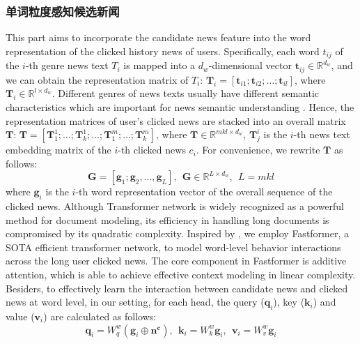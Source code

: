 \documentclass[withoutpreface,bwprint]{cumcmthesis} %
\begin{document}
	\subsubsection{ 单词粒度感知候选新闻}
	This part aims to incorporate the candidate news feature into the word representation of the clicked history news of users. 
	Specifically, each word $t_{ij}$ of the $i$-th genre news text $T_i$ is mapped into a $d_w$-dimensional vector $\mathbf{t}_{ij} \in \mathbb{R}^{d_w}$, and we can obtain the representation matrix of $T_i$: $\mathbf{T}_i = [\mathbf{t}_{i1}; \mathbf{t}_{i2}; \dots; \mathbf{t}_{il}]$, where  $\mathbf{T}_i \in \mathbb{R}^{l \times d_w}$. 
	Diﬀerent genres of news texts usually have diﬀerent semantic characteristics which are important for news semantic understanding .  Hence, the representation matrices of user's clicked news are stacked into an overall matrix $\mathbf{T}$:
	$\mathbf{T} =[\mathbf{T} _1^1;\ldots;\mathbf{T} _k^1;\ldots;\mathbf{T} _1^m;\ldots;\mathbf{T} _k^m]$,
	where $\mathbf{T} \in \mathbb{R}^{mkl \times d_w}$, $\mathbf{T}_j^i$ is the $i$-th news text embedding matrix of the $i$-th clicked news $c_i$. For convenience, we rewrite $\mathbf{T}$ as follows:
	\begin{equation}
	\mathbf{G} = [\mathbf{g}_1; \mathbf{g}_2, \dots, \mathbf{g}_L],~~ \mathbf{G} \in \mathbb{R}^{L\times d_w},~~L = mkl
	\end{equation}
	where $\mathbf{g}_i$ is the $i$-th word representation vector of the overall sequence of the clicked news. 
	Although Transformer network  is widely recognized as a powerful method for document modeling, its efficiency in handling long documents is compromised by its quadratic complexity. Inspired by , we employ Fastformer, a SOTA efficient transformer network, to model word-level behavior interactions across the
	long user clicked news. The core component in Fastformer is additive attention, which is able to achieve effective context modeling in linear complexity. Besiders, to effectively learn the interaction between candidate news and clicked news at word level, in our setting, for each head, the query ($\mathbf{q}_i$), key ($\mathbf{k}_i$) and value ($\mathbf{v}_i$) are calculated as follows:
	\begin{equation}
	\mathbf{q}_i = W^w_q(\mathbf{g}_i \oplus \mathbf{n^c}),~~
	\mathbf{k}_i = W^w_k\mathbf{g}_i,~~
	\mathbf{v}_i = W^w_v\mathbf{g}_i
	\end{equation}
\end{document}
